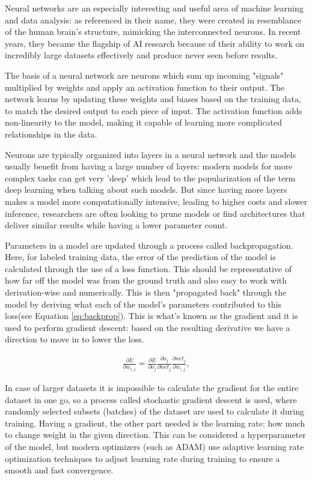 	Neural networks are an especially interesting and useful area of machine learning and data analysis: as referenced in their name, they were created in resemblance of the human brain's structure, mimicking the interconnected neurons. In recent years, they became the flagship of AI research because of their ability to work on incredibly large datasets effectively and produce never seen before results. 
	
	The basis of a neural network are neurons which sum up incoming "signals" multiplied by weights and apply an activation function to their output. The network learns by updating these weights and biases based on the training data, to match the desired output to each piece of input. The activation function adds non-linearity to the model, making it capable of learning more complicated relationships in the data.
	
	Neurons are typically organized into layers in a neural network and the models usually benefit from having a large number of layers: modern models for more complex tasks can get very 'deep' which lead to the popularization of the term deep learning when talking about such models. But since having more layers makes a model more computationally intensive, leading to higher costs and slower inference, researchers are often looking to prune models or find architectures that deliver similar results while having a lower parameter count\cite{liang2021pruning}.
	
	Parameters in a model are updated through a process called backpropagation\cite{rumelhart1986learning}. Here, for labeled training data, the error of the prediction of the model is calculated through the use of a loss function. This should be representative of how far off the model was from the ground truth and also easy to work with derivation-wise and numerically. This is then "propagated back" through the model by deriving what each of the model's parameters contributed to this loss(see Equation \ref{eq:backprop}). This is what's known as the gradient and it is used to perform gradient descent: based on the resulting derivative we have a direction to move in to lower the loss.
	
	\begin{align}
		\label{eq:backprop}
		\frac{\partial{E}}{\partial{w_{i,j}}} = \frac{\partial{E}}{\partial{o_j}}\frac{\partial{o_j}}{\partial{net_j}}\frac{\partial{net_j}}{\partial{w_{i,j}}},
	\end{align}
	
	
	In case of larger datasets it is impossible to calculate the gradient for the entire dataset in one go, so a process called stochastic gradient descent\cite{amari1993backpropagation} is used, where randomly selected subsets (batches) of the dataset are used to calculate it during training. Having a gradient, the other part needed is the learning rate: how much to change weight in the given direction. This can be considered a hyperparameter of the model, but modern optimizers (such as ADAM\cite{kingma2014adam}) use adaptive learning rate optimization techniques to adjust learning rate during training to ensure a smooth and fast convergence.
	
